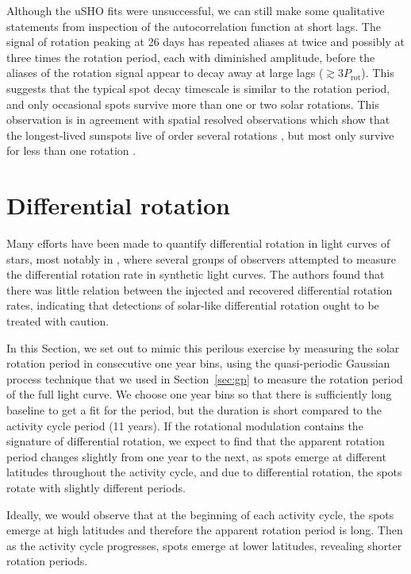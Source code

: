 Although the uSHO fits were unsuccessful, we can still make some qualitative statements from inspection of the autocorrelation function at short lags. The signal of rotation peaking at 26 days has repeated aliases at twice and possibly at three times the rotation period, each with diminished amplitude, before the aliases of the rotation signal appear to decay away at large lags ($\gtrsim 3 P_\mathrm{rot}$). This suggests that the typical spot decay timescale is similar to the rotation period, and only occasional spots survive more than one or two solar rotations. This observation is in agreement with spatial resolved observations which show that the longest-lived sunspots live of order several rotations \citep{Pettit1951, Howe2000}, but most only survive for less than one rotation \citep{Petrovay1997}. 


\section{Differential rotation} \label{sec:dr}

Many efforts have been made to quantify differential rotation in \kepler light curves of stars, most notably in \citet{Aigrain2015}, where several groups of observers attempted to measure the differential rotation rate in synthetic light curves. The authors found that there was little relation between the injected and recovered differential rotation rates, indicating that \kepler detections of solar-like differential rotation ought to be treated with caution. 

In this Section, we set out to mimic this perilous exercise by measuring the solar rotation period in consecutive one year bins, using the quasi-periodic Gaussian process technique that we used in Section~\ref{sec:gp} to measure the rotation period of the full light curve. We choose one year bins so that there is sufficiently long baseline to get a fit for the period, but the duration is short compared to the activity cycle period (11 years). If the rotational modulation contains the signature of differential rotation, we expect to find that the apparent rotation period changes slightly from one year to the next, as spots emerge at different latitudes throughout the activity cycle, and due to differential rotation, the spots rotate with slightly different periods. 

Ideally, we would observe that at the beginning of each activity cycle, the spots emerge at high latitudes and therefore the apparent rotation period is long. Then as the activity cycle progresses, spots emerge at lower latitudes, revealing shorter rotation periods. 

